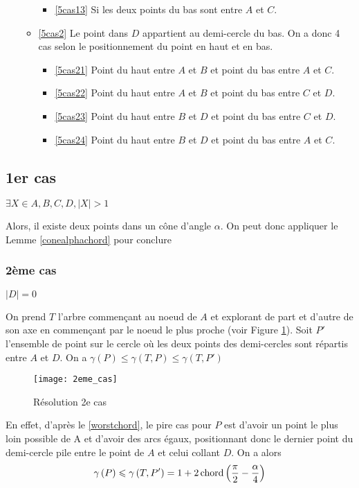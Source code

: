 \begin{itemize}
\begin{itemize}
\begin{itemize}
			\item \ref{5cas13} Si les deux points du bas sont entre $A$ et $C$.
		\end{itemize}
		\item \ref{5cas2} Le point dans $D$ appartient au demi-cercle du bas.
		On a donc 4 cas selon le positionnement du point en haut et en bas.
		\begin{itemize}
			\item \ref{5cas21} Point du haut entre $A$ et $B$ et point du bas entre $A$ et $C$.
			\item \ref{5cas22} Point du haut entre $A$ et $B$ et point du bas entre $C$ et $D$.
			\item \ref{5cas23} Point du haut entre $B$ et $D$ et point du bas entre $C$ et $D$.
			\item \ref{5cas24} Point du haut entre $B$ et $D$ et point du bas entre $A$ et $C$.
		\end{itemize}
	\end{itemize}
\end{itemize}

\subsection*{1er cas}\label{1cas} $\exists X \in {A,B,C,D}, |X| > 1$

Alors, il existe deux points dans un cône d'angle $\alpha$. On peut donc appliquer le Lemme \ref{conealphachord} pour conclure

\subsubsection*{2ème cas}\label{2cas} $|D| = 0$

On prend $T$ l'arbre commençant au noeud de $A$ et explorant de part et d'autre
de son axe en commençant par le noeud le plus proche (voir Figure \ref{fig:2eme_cas}).
Soit $P'$ l'ensemble de point sur le cercle où les deux points des demi-cercles sont répartis entre $A$ et $D$.
On a $\gamma\left(P\right) \leq  \gamma\left(T, P\right) \leq \gamma\left(T, P'\right)$

\begin{figure}[h!]
  \centering
  \texttt{[image: 2eme\_cas]}
  \caption{Résolution 2e cas}
  \label{fig:2eme_cas}
\end{figure}

En effet, d'après le \cref{worstchord}, le pire cas pour $P$ est d'avoir un point le plus loin possible de A et d'avoir des arcs égaux, positionnant donc le dernier point du demi-cercle pile entre le point de $A$ et celui collant $D$. On a alors
$$\gamma\left(P\right) \leqslant \gamma\left(T, P'\right) = 1 + 2\operatorname{chord}\left(\frac{\pi}{2} -
  \frac{\alpha}{4}\right)$$

